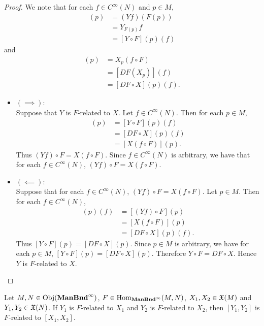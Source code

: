 \documentclass{book}
\begin{document}
\begin{proof}
	We note that for each $f \in C^{\infty}(N)$ and $p \in M$, 
	\begin{align*}
		[(Yf) \circ F] (p) 
		& = (Yf)(F(p)) \\
		& = Y_{F(p)}f \\
		& = [Y \circ F](p) (f)
	\end{align*}
	and
	\begin{align*}
		[X(f \circ F)](p)
		& = X_p(f \circ F) \\
		& = [DF(X_p)](f) \\
		& = [DF \circ X](p) (f).
	\end{align*}
	\begin{itemize}
		\item $(\implies)$: \\
		Suppose that $Y$ is $F$-related to $X$. Let $f \in C^{\infty}(N)$. Then for each $p \in M$,
		\begin{align*}
			[(Yf) \circ F] (p) 
			& = [Y \circ F](p) (f) \\
			& = [DF \circ X](p) (f) \\
			& = [X(f \circ F)](p).
		\end{align*}
		Thus $(Yf) \circ F = X(f \circ F)$. Since $f \in C^{\infty}(N)$ is arbitrary, we have that for each $f \in C^{\infty}(N)$, $(Yf) \circ F = X(f \circ F)$. 
		\item $(\impliedby)$: \\
		Suppose that for each $f \in C^{\infty}(N)$, $(Yf) \circ F = X(f \circ F)$. Let $p \in M$. Then for each $f \in C^{\infty}(N)$,
		\begin{align*}
			[Y \circ F](p)(f)
			& = [(Yf) \circ F](p) \\
			& = [X(f \circ F)](p) \\
			& = [DF \circ X](p) (f).
		\end{align*}
		Thus $[Y \circ F](p) = [DF \circ X](p)$. Since $p \in M$ is arbitrary, we have for each $p \in M$, $[Y \circ F](p) = [DF \circ X](p)$. Therefore $Y \circ F = DF \circ X$. Hence $Y$ is $F$-related to $X$. 
	\end{itemize}
\end{proof}

\begin{ex}
	Let $M, N \in \operatorname{Obj}(\operatorname*{\text{\textbf{ManBnd}}^{\infty}})$, $F \in \operatorname{Hom}_{\operatorname*{\text{\textbf{ManBnd}}^{\infty}}}(M, N)$, $X_1,X_2 \in \mathfrak{X}(M)$ and $Y_1, Y_2 \in \mathfrak{X}(N)$. If $Y_1$ is $F$-related to $X_1$ and $Y_2$ is $F$-related to $X_2$, then $[Y_1, Y_2]$ is $F$-related to $[X_1, X_2]$.  
\end{ex}
\end{document}

